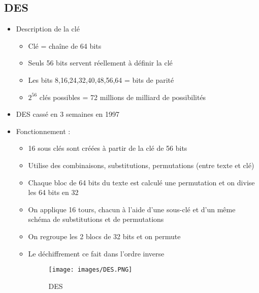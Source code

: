 \documentclass[a4paper]{article}
\begin{document}
\subsection{DES}
\begin{itemize}[label=\textbullet, font=\Large]
    \item Description de la clé
    \begin{itemize}[label=, font=\scriptsize]
        \item Clé = chaîne de 64 bits
        \item Seuls 56 bits servent réellement à définir la clé
        \item Les bits 8,16,24,32,40,48,56,64 = bits de parité
        \item $2^{56}$ clés possibles = 72 millions de milliard de possibilités
    \end{itemize}
    \item DES cassé en 3 semaines en 1997
    \item Fonctionnement :
    \begin{itemize}[label=, font=\scriptsize]
        \item 16 sous clés sont créées à partir de la clé de 56 bits
        \item Utilise des combinaisons, substitutions, permutations (entre texte et clé)
        \item Chaque bloc de 64 bits du texte est calculé une permutation et on divise les 64 bits en 32
        \item On applique 16 tours, chacun à l'aide d'une sous-clé et d'un même schéma de substitutions et de permutations
        \item On regroupe les 2 blocs de 32 bits et on permute
        \item Le déchiffrement ce fait dans l'ordre inverse 
        \begin{figure}[H]
            \centering
            \texttt{[image: images/DES.PNG]}
            \caption{DES}
        \end{figure}
    \end{itemize}
\end{itemize}
\end{document}
